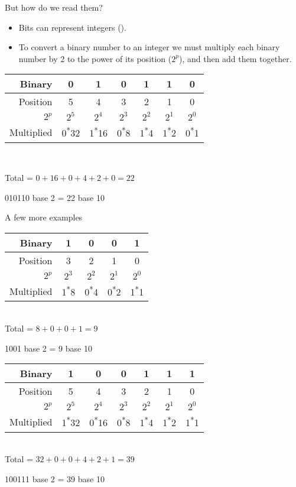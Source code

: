 \begin{frame}{But how do we read them?}
\begin{itemize}
\item Bits can represent integers ().
\item To convert a binary number to an integer we must multiply each binary number by 2 to the power of its position ($2^p$), and then add them together.
\end{itemize}
\begin{center}
\begin{tabular}{|r|c|c|c|c|c|c|}\hline
Binary & 0 & 1 & 0 & 1 & 1 & 0\\\hline \pause
Position & 5 & 4 & 3 & 2 & 1 & 0\\\hline \pause
$2^p$& $2^5$ & $2^4$ & $2^3$ & $2^2$ & $2^1$ & $2^0$\\\hline \pause
Multiplied&0\textsuperscript{*}32 &1\textsuperscript{*}16&0\textsuperscript{*}8&1\textsuperscript{*}4&1\textsuperscript{*}2&0\textsuperscript{*}1\\\hline
\end{tabular}\\\pause


Total = $0 + 16 + 0 + 4 + 2 + 0 = 22$ \\ \pause

010110 base 2 = 22 base 10
\end{center}
\end{frame}


\begin{frame}{A few more examples}
\begin{center}
\begin{tabular}{|r|c|c|c|c|}\hline
Binary & 1 & 0 & 0 & 1\\\hline \pause
Position & 3 & 2 & 1 & 0\\\hline \pause
$2^p$& $2^3$ & $2^2$ & $2^1$ & $2^0$\\\hline \pause
Multiplied&1\textsuperscript{*}8&0\textsuperscript{*}4&0\textsuperscript{*}2&1\textsuperscript{*}1\\\hline
\end{tabular}\\ \pause
Total = $8 + 0 + 0 + 1 = 9$ \\ \pause

1001 base 2 = 9 base 10

\begin{tabular}{|r|c|c|c|c|c|c|}\hline
Binary & 1 & 0 & 0 & 1 & 1 & 1\\\hline \pause
Position & 5 & 4 & 3 & 2 & 1 & 0\\\hline \pause
$2^p$& $2^5$ & $2^4$ & $2^3$ & $2^2$ & $2^1$ & $2^0$\\\hline \pause
Multiplied&1\textsuperscript{*}32 &0\textsuperscript{*}16&0\textsuperscript{*}8&1\textsuperscript{*}4&1\textsuperscript{*}2&1\textsuperscript{*}1\\\hline
\end{tabular}\pause\\
Total = $32 + 0 + 0 + 4 + 2 + 1 = 39$ \\ \pause

100111 base 2 = 39 base 10
\end{center}
\end{frame}


